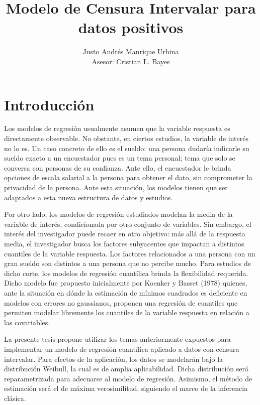 \documentclass{report}
\title{Modelo de Censura Intervalar para datos positivos}
\author{Justo Andrés Manrique Urbina \\ Asesor: Cristian L. Bayes}
\begin{document}
\maketitle



\tableofcontents{}

\chapter{Introducción}

Los modelos de regresión usualmente asumen que la variable respuesta es directamente observable. No obstante, en ciertos estudios, la variable de interés no lo es. Un caso concreto de ello es el sueldo: una persona dudaría indicarle su sueldo exacto a un encuestador pues es un tema personal; tema que solo se conversa con personas de su confianza. Ante ello, el encuestador le brinda opciones de escala salarial a la persona para obtener el dato, sin comprometer la privacidad de la persona. Ante esta situación, los modelos tienen que ser adaptados a esta nueva estructura de datos y estudios.

Por otro lado, los modelos de regresión estudiados modelan la media de la variable de interés, condicionada por otro conjunto de variables. Sin embargo, el interés del investigador puede recaer en otro objetivo: más allá de la respuesta media, el investigador busca los factores subyacentes que impactan a distintos cuantiles de la variable respuesta. Los factores relacionados a una persona con un gran sueldo son distintos a una persona que no percibe mucho. Para estudios de dicho corte, los modelos de regresión cuantílica brinda la flexibilidad requerida. Dicho modelo fue propuesto inicialmente por Koenker y Basset (1978) quienes, ante la situación en dónde la estimación de mínimos cuadrados es deficiente en modelos con errores no gaussianos, proponen una regresión de cuantiles que permiten modelar libremente los cuantiles de la variable respuesta en relación a las covariables.

La presente tesis propone utilizar los temas anteriormente expuestos para implementar un modelo de regresión cuantílica aplicado a datos con censura intervalar. Para efectos de la aplicación, los datos se modelarán bajo la distribución Weibull, la cual es de amplia aplicabilidad. Dicha distribución será reparametrizada para adecuarse al modelo de regresión. Asimismo, el método de estimación será el de máxima verosimilitud,  siguiendo el marco de la inferencia clásica.
\end{document}
